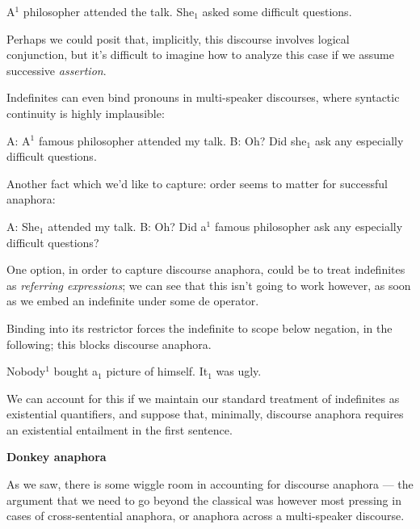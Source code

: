 \documentclass[nols,twoside,nofonts,nobib,nohyper]{tufte-handout}
\theoremstyle{definition}
\begin{document}
\ex
A$^{1}$ philosopher attended the talk. She$_{1}$ asked some difficult questions.
\xe

Perhaps we could posit that, implicitly, this discourse involves logical conjunction, but it's difficult to imagine how to analyze this case if we assume successive \textit{assertion}.

Indefinites can even bind pronouns in multi-speaker discourses, where syntactic continuity is highly implausible:

\pex
\a A: A$^{1}$ famous philosopher attended my talk.
\a B: Oh? Did she$_{1}$ ask any especially difficult questions.
\xe

Another fact which we'd like to capture: order seems to matter for successful anaphora:

\pex
\a A: She$_{1}$ attended my talk.
\a\ljudge{\#}B: Oh? Did a$^{1}$ famous philosopher ask any especially difficult questions?
\xe

One option, in order to capture discourse anaphora, could be to treat indefinites as \textit{referring expressions}; we can see that this isn't going to work however, as soon as we embed an indefinite under some \ac{de} operator.

Binding into its restrictor forces the indefinite to scope below negation, in the following; this blocks discourse anaphora.

\ex
Nobody$^{1}$ bought a$_{1}$ picture of himself. It$_{1}$ was ugly.
\xe

We can account for this if we maintain our standard treatment of indefinites as existential quantifiers, and suppose that, minimally, discourse anaphora requires an existential entailment in the first sentence.

\textbf{Donkey anaphora}

As we saw, there is some wiggle room in accounting for discourse anaphora --- the argument that we need to go beyond the classical was however most pressing in cases of cross-sentential anaphora, or anaphora across a multi-speaker discourse.
\end{document}
